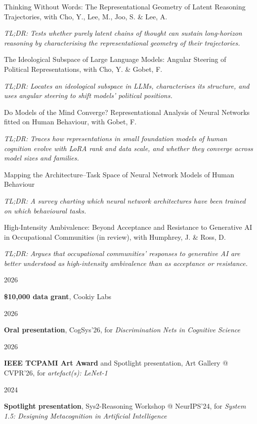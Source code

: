 \documentclass[10pt]{article}
\newlength{\labelw}\setlength{\labelw}{123pt}
\newlength{\colgap}\setlength{\colgap}{3pt}
\newlength{\contentw}\setlength{\contentw}{381pt}
\newcommand{\lblfont}{\fontsize{7.5}{9.5}\selectfont}
\newcommand{\lbl}[1]{{\lblfont\textls[90]{#1}}}
\newcommand{\secrule}{\par\needspace{48pt}\vspace{11pt}\noindent{\color{textcol}\rule{\textwidth}{0.75pt}}\par\vspace{10pt}\nopagebreak}
\newcommand{\lblrow}[1]{\noindent\lbl{#1}\par\nopagebreak\vspace{8pt}}
\newcommand{\cvrow}[2]{\noindent\begin{minipage}[t]{\labelw}\raggedright\lbl{#1}\end{minipage}\hspace{\colgap}%
\begin{minipage}[t]{\contentw}#2\end{minipage}\par}
\newcommand{\daterow}[2]{\noindent\begin{minipage}[t]{\labelw}\raggedright #1\end{minipage}\hspace{\colgap}%
\begin{minipage}[t]{\contentw}#2\end{minipage}\par}
\newcommand{\entrysep}{\vspace{10pt}}
\begin{document}
\newpage
\secrule
\cvrow{WORKING PAPERS}{%
Thinking Without Words: The Representational Geometry of Latent Reasoning Trajectories, with Cho, Y., Lee, M., Joo, S. \& Lee, A.
\par\vspace{2pt}
\textit{TL;DR: Tests whether purely latent chains of thought can sustain long-horizon reasoning by characterising the representational geometry of their trajectories.}
\par\vspace{10pt}
The Ideological Subspace of Large Language Models: Angular Steering of Political Representations, with Cho, Y. \& Gobet, F.
\par\vspace{2pt}
\textit{TL;DR: Locates an ideological subspace in LLMs, characterises its structure, and uses angular steering to shift models' political positions.}
\par\vspace{10pt}
Do Models of the Mind Converge? Representational Analysis of Neural Networks fitted on Human Behaviour, with Gobet, F.
\par\vspace{2pt}
\textit{TL;DR: Traces how representations in small foundation models of human cognition evolve with LoRA rank and data scale, and whether they converge across model sizes and families.}
\par\vspace{10pt}
Mapping the Architecture--Task Space of Neural Network Models of Human Behaviour
\par\vspace{2pt}
\textit{TL;DR: A survey charting which neural network architectures have been trained on which behavioural tasks.}
\par\vspace{10pt}
High-Intensity Ambivalence: Beyond Acceptance and Resistance to Generative AI in Occupational Communities (in review), with Humphrey, J. \& Ross, D.
\par\vspace{2pt}
\textit{TL;DR: Argues that occupational communities' responses to generative AI are better understood as high-intensity ambivalence than as acceptance or resistance.}}

\secrule
\lblrow{HONOURS, GRANTS \& AWARDS}
\daterow{2026}{\textbf{\$10,000 data grant}, Cookiy Labs}
\entrysep
\daterow{2026}{\textbf{Oral presentation}, CogSys'26, for \textit{Discrimination Nets in Cognitive Science}}
\entrysep
\daterow{2026}{\textbf{IEEE TCPAMI Art Award} and Spotlight presentation, Art Gallery @ CVPR'26, for \textit{artefact(s): LeNet-1}}
\entrysep
\daterow{2024}{\textbf{Spotlight presentation}, Sys2-Reasoning Workshop @ NeurIPS'24, for \textit{System 1.5: Designing Metacognition in Artificial Intelligence}}
\end{document}
